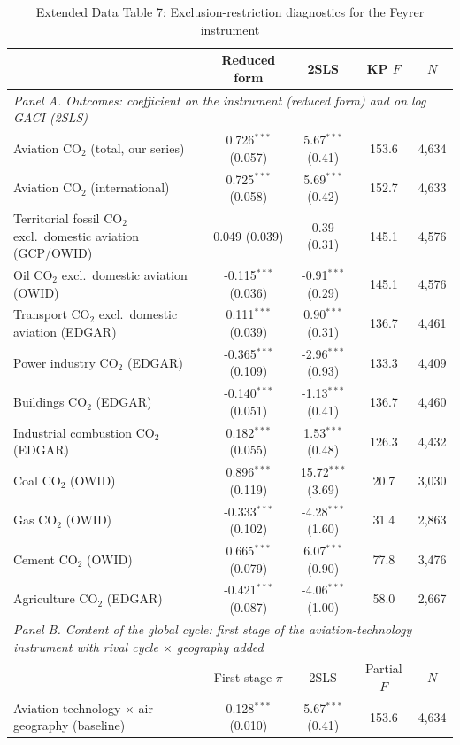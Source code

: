 \documentclass[12pt]{article}
\begin{document}
\begin{table}[htbp]
\centering
\begin{threeparttable}
\caption{Extended Data Table 7: Exclusion-restriction diagnostics for the Feyrer instrument}
\label{tab:exclusion}
\scriptsize
\begin{tabular}{lcccc}
\toprule
 & Reduced form & 2SLS & KP $F$ & $N$ \\
\midrule
\multicolumn{5}{l}{\textit{Panel A. Outcomes: coefficient on the instrument (reduced form) and on log GACI (2SLS)}} \\
  Aviation CO$_2$ (total, our series) & 0.726$^{***}$ (0.057) & 5.67$^{***}$ (0.41) & 153.6 & 4,634 \\
  Aviation CO$_2$ (international) & 0.725$^{***}$ (0.058) & 5.69$^{***}$ (0.42) & 152.7 & 4,633 \\
  Territorial fossil CO$_2$ excl.\ domestic aviation (GCP/OWID) & 0.049 (0.039) & 0.39 (0.31) & 145.1 & 4,576 \\
  Oil CO$_2$ excl.\ domestic aviation (OWID) & -0.115$^{***}$ (0.036) & -0.91$^{***}$ (0.29) & 145.1 & 4,576 \\
  Transport CO$_2$ excl.\ domestic aviation (EDGAR) & 0.111$^{***}$ (0.039) & 0.90$^{***}$ (0.31) & 136.7 & 4,461 \\
  Power industry CO$_2$ (EDGAR) & -0.365$^{***}$ (0.109) & -2.96$^{***}$ (0.93) & 133.3 & 4,409 \\
  Buildings CO$_2$ (EDGAR) & -0.140$^{***}$ (0.051) & -1.13$^{***}$ (0.41) & 136.7 & 4,460 \\
  Industrial combustion CO$_2$ (EDGAR) & 0.182$^{***}$ (0.055) & 1.53$^{***}$ (0.48) & 126.3 & 4,432 \\
  Coal CO$_2$ (OWID) & 0.896$^{***}$ (0.119) & 15.72$^{***}$ (3.69) & 20.7 & 3,030 \\
  Gas CO$_2$ (OWID) & -0.333$^{***}$ (0.102) & -4.28$^{***}$ (1.60) & 31.4 & 2,863 \\
  Cement CO$_2$ (OWID) & 0.665$^{***}$ (0.079) & 6.07$^{***}$ (0.90) & 77.8 & 3,476 \\
  Agriculture CO$_2$ (EDGAR) & -0.421$^{***}$ (0.087) & -4.06$^{***}$ (1.00) & 58.0 & 2,667 \\
\midrule
\multicolumn{5}{l}{\textit{Panel B. Content of the global cycle: first stage of the aviation-technology instrument with rival cycle $\times$ geography added}} \\
 & First-stage $\pi$ & 2SLS & Partial $F$ & $N$ \\
  Aviation technology $\times$ air geography (baseline) & 0.128$^{***}$ (0.010) & 5.67$^{***}$ (0.41) & 153.6 & 4,634 \\

\end{tabular}
\end{threeparttable}
\end{table}
\end{document}
